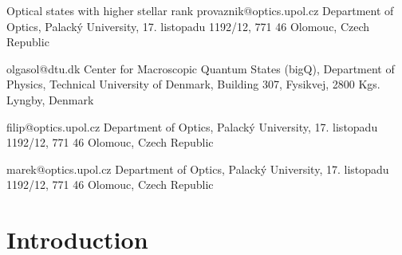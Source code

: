 \documentclass{article}
\begin{document}
\ArticleTitle
  {Optical states with higher stellar rank}
  {provaznik@optics.upol.cz}
\ArticleAuthorAddress
  {Department of Optics, Palack\'{y} University, 17. listopadu 1192/12, 771 46 Olomouc, Czech Republic}

  {olgasol@dtu.dk}
\ArticleAuthorAddress
  {Center for Macroscopic Quantum States (bigQ), Department of Physics, Technical University of Denmark, Building 307, Fysikvej, 2800 Kgs. Lyngby, Denmark}

  {filip@optics.upol.cz}
\ArticleAuthorAddress
  {Department of Optics, Palack\'{y} University, 17. listopadu 1192/12, 771 46 Olomouc, Czech Republic}

  {marek@optics.upol.cz}
\ArticleAuthorAddress
  {Department of Optics, Palack\'{y} University, 17. listopadu 1192/12, 771 46 Olomouc, Czech Republic}

\ArticleTitlePrint

\begin{abstract}\noindent
  Quantum non-Gaussian states of traveling light fields are crucial components of quantum information processing protocols; however, their preparation is experimentally challenging. In this paper, we discuss the minimal requirements imposed on the quantum efficiency of photon number resolving detectors and the quality of the squeezing operation in an experimental realization of certifiable quantum non-Gaussian states of individual photonic states with three, four, and five photons.
\end{abstract}


%

\section{Introduction}
\end{document}
